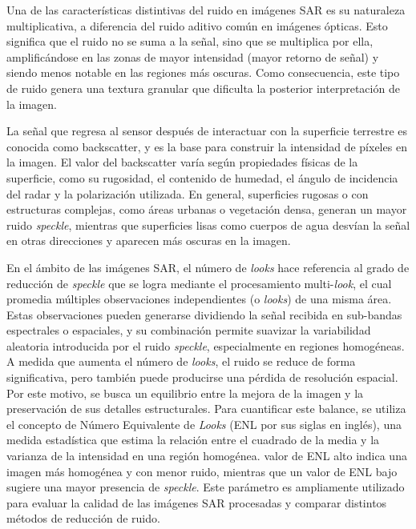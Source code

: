 Una de las características distintivas del ruido en imágenes SAR es su naturaleza multiplicativa, a diferencia del ruido aditivo común en imágenes ópticas. Esto significa que el ruido no se suma a la señal, sino que se multiplica por ella, amplificándose en las zonas de mayor intensidad (mayor retorno de señal) y siendo menos notable en las regiones más oscuras. Como consecuencia, este tipo de ruido genera una textura granular que dificulta la posterior interpretación de la imagen.

La señal que regresa al sensor después de interactuar con la superficie terrestre es conocida como backscatter, y es la base para construir la intensidad de píxeles en la imagen. El valor del backscatter varía según propiedades físicas de la superficie, como su rugosidad, el contenido de humedad, el ángulo de incidencia del radar y la polarización utilizada. En general, superficies rugosas o con estructuras complejas, como áreas urbanas o vegetación densa, generan un mayor ruido \emph{speckle}, mientras que superficies lisas como cuerpos de agua desvían la señal en otras direcciones y aparecen más oscuras en la imagen.

En el ámbito de las imágenes SAR, el número de \emph{looks} hace referencia al grado de reducción de \emph{speckle} que se logra mediante el procesamiento multi-\emph{look}, el cual promedia múltiples observaciones independientes (o \emph{looks}) de una misma área. Estas observaciones pueden generarse dividiendo la señal recibida en sub-bandas espectrales o espaciales, y su combinación permite suavizar la variabilidad aleatoria introducida por el ruido \emph{speckle}, especialmente en regiones homogéneas. A medida que aumenta el número de \emph{looks}, el ruido se reduce de forma significativa, pero también puede producirse una pérdida de resolución espacial. Por este motivo, se busca un equilibrio entre la mejora de la imagen y la preservación de sus detalles estructurales. Para cuantificar este balance, se utiliza el concepto de Número Equivalente de \emph{Looks} (ENL por sus siglas en inglés), una medida estadística que estima la relación entre el cuadrado de la media y la varianza de la intensidad en una región homogénea. valor de ENL alto indica una imagen más homogénea y con menor ruido, mientras que un valor de ENL bajo sugiere una mayor presencia de \emph{speckle}. Este parámetro es ampliamente utilizado para evaluar la calidad de las imágenes SAR procesadas y comparar distintos métodos de reducción de ruido.

